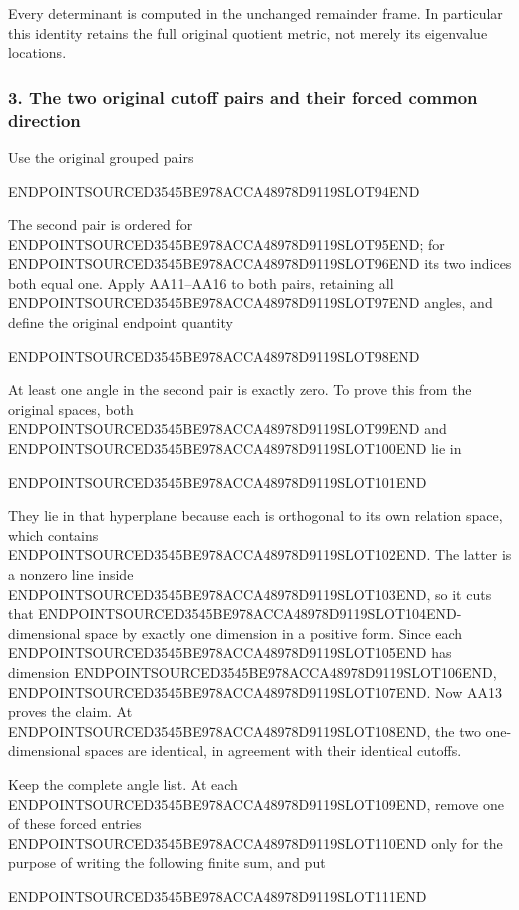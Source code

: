 Every determinant is computed in the unchanged remainder frame. In particular this identity retains the full original quotient metric, not merely its eigenvalue locations.

\subsubsection{3. The two original cutoff pairs and their forced common direction}\label{endpoint-all_degree_angle_review--the-two-original-cutoff-pairs-and-their-forced-common-direction}

Use the original grouped pairs

ENDPOINTSOURCED3545BE978ACCA48978D9119SLOT94END

The second pair is ordered for ENDPOINTSOURCED3545BE978ACCA48978D9119SLOT95END; for ENDPOINTSOURCED3545BE978ACCA48978D9119SLOT96END its two indices both equal one. Apply AA11--AA16 to both pairs, retaining all ENDPOINTSOURCED3545BE978ACCA48978D9119SLOT97END angles, and define the original endpoint quantity

ENDPOINTSOURCED3545BE978ACCA48978D9119SLOT98END

At least one angle in the second pair is exactly zero. To prove this from the original spaces, both ENDPOINTSOURCED3545BE978ACCA48978D9119SLOT99END and ENDPOINTSOURCED3545BE978ACCA48978D9119SLOT100END lie in

ENDPOINTSOURCED3545BE978ACCA48978D9119SLOT101END

They lie in that hyperplane because each is orthogonal to its own relation space, which contains ENDPOINTSOURCED3545BE978ACCA48978D9119SLOT102END. The latter is a nonzero line inside ENDPOINTSOURCED3545BE978ACCA48978D9119SLOT103END, so it cuts that ENDPOINTSOURCED3545BE978ACCA48978D9119SLOT104END-dimensional space by exactly one dimension in a positive form. Since each ENDPOINTSOURCED3545BE978ACCA48978D9119SLOT105END has dimension ENDPOINTSOURCED3545BE978ACCA48978D9119SLOT106END, ENDPOINTSOURCED3545BE978ACCA48978D9119SLOT107END. Now AA13 proves the claim. At ENDPOINTSOURCED3545BE978ACCA48978D9119SLOT108END, the two one-dimensional spaces are identical, in agreement with their identical cutoffs.

Keep the complete angle list. At each ENDPOINTSOURCED3545BE978ACCA48978D9119SLOT109END, remove one of these forced entries ENDPOINTSOURCED3545BE978ACCA48978D9119SLOT110END only for the purpose of writing the following finite sum, and put

ENDPOINTSOURCED3545BE978ACCA48978D9119SLOT111END

